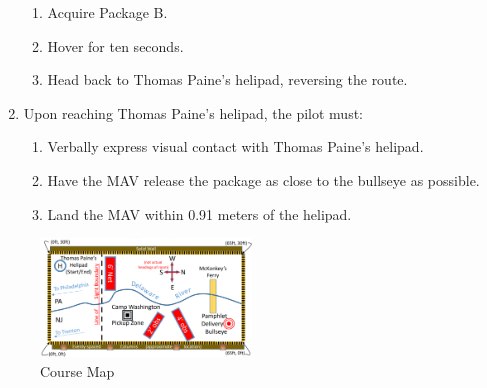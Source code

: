 \documentclass[onecolumn, draftclsnofoot, 10pt, compsoc]{IEEEtran}
\begin{document}
\begin{enumerate}
\begin{enumerate}
\item Acquire Package B.
\item Hover for ten seconds.
\item Head back to Thomas Paine’s helipad, reversing the route.
\end{enumerate}
\item Upon reaching Thomas Paine’s helipad, the pilot must:
\begin{enumerate}
\item Verbally express visual contact with Thomas Paine’s helipad.
\item Have the MAV release the package as close to the bullseye as possible.
\item Land the MAV within 0.91 meters of the helipad.
\end{enumerate}
\end{enumerate}
\begin{figure}[h!]
\centering
\includegraphics[width=0.5\textwidth]{course_map}
\caption{Course Map}
\end{figure}
\end{document}

